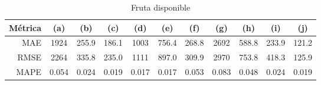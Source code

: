 \documentclass[a4paper,10pt]{article}
\begin{document}
\begin{table}[t]
 \begin{center}
  \begin{tabular}{|r|c|c|c|c|c|c|c|c|c|c|}
    Métrica & (a) & (b) & (c) & (d) & (e) & (f) & (g) & (h) & (i) & (j) \\ \hline
    MAE & 1924 & 255.9 & 186.1 & 1003 & 756.4 & 268.8 & 2692 & 588.8 & 233.9 & 121.2 \\
    RMSE & 2264 & 335.8 & 235.0 & 1111 & 897.0 & 309.9 & 2970 & 753.8 & 418.3 & 125.9 \\
    MAPE & 0.054 & 0.024 & 0.019 & 0.017 & 0.017 & 0.053 & 0.083 & 0.048 & 0.024 & 0.019 \\ \hline
  \end{tabular}
  \caption{Fruta disponible}
  \label{tab:eth_prophet_m}
 \end{center}
\end{table}
\end{document}
